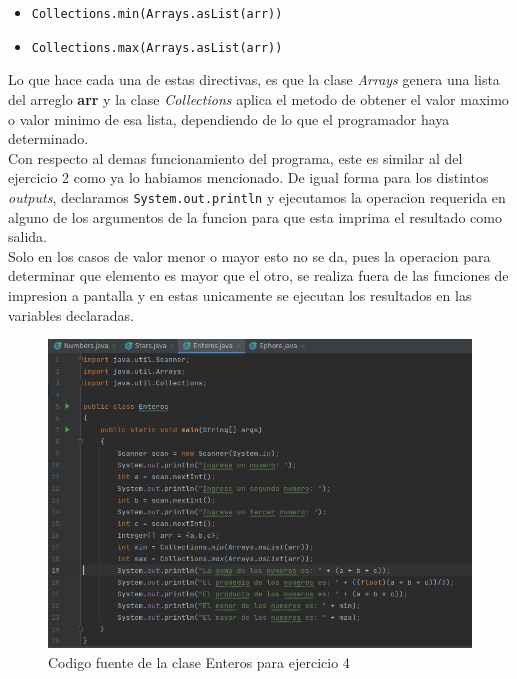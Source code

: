 \documentclass{article}
\begin{document}
 		\begin{itemize}
 			\item \verb*|Collections.min(Arrays.asList(arr))|
 			\item \verb*|Collections.max(Arrays.asList(arr))|
 		\end{itemize}
 		
 		Lo que hace cada una de estas directivas, es que la clase \emph{Arrays} genera una lista del arreglo \textbf{arr} y la clase \emph{Collections} aplica el metodo de obtener el valor maximo o valor minimo de esa lista, dependiendo de lo que el programador haya determinado.\\
 		
 		Con respecto al demas funcionamiento del programa, este es similar al del ejercicio 2 como ya lo habiamos mencionado. De igual forma para los distintos \emph{outputs}, declaramos \verb*|System.out.println| y ejecutamos la operacion requerida en alguno de los argumentos de la funcion para que esta imprima el resultado como salida.\\
 		
 		Solo en los casos de valor menor o mayor esto no se da, pues la operacion para determinar que elemento es mayor que el otro, se realiza fuera de las funciones de impresion a pantalla y en estas unicamente se ejecutan los resultados en las variables declaradas.
 		
 		\begin{figure}[H]
 			\centering
 			\includegraphics[scale = 0.55]{images/enteros}
 			\caption{Codigo fuente de la clase Enteros para ejercicio 4}
 		\end{figure}
 		
\end{document}
